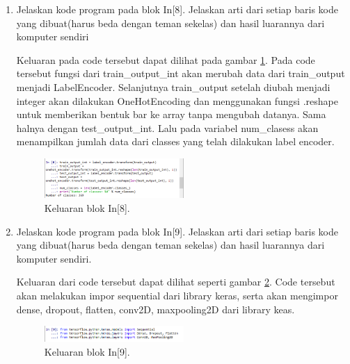 \begin{enumerate}
\item Jelaskan kode program pada blok In[8]. Jelaskan arti dari setiap baris kode yang dibuat(harus beda dengan teman sekelas) dan hasil luarannya dari komputer sendiri \par

Keluaran pada code tersebut dapat dilihat pada gambar \ref{math8}. Pada code tersebut fungsi dari train\_output\_int akan merubah data dari train\_output menjadi LabelEncoder. Selanjutnya train\_output setelah diubah menjadi integer akan dilakukan OneHotEncoding dan menggunakan fungsi .reshape untuk memberikan bentuk bar ke array tanpa mengubah datanya. Sama halnya dengan test\_output\_int. Lalu pada variabel num\_clasess akan menampilkan jumlah data dari classes yang telah dilakukan label encoder.
		\begin{figure}[!htbp]
		\centerline{\includegraphics[width=0.5\textwidth]{figures/im/math8.png}}
		\caption{Keluaran blok In[8].}
		\label{math8}
		\end{figure}

\item Jelaskan kode program pada blok In[9]. Jelaskan arti dari setiap baris kode yang dibuat(harus beda dengan teman sekelas) dan hasil luarannya dari komputer sendiri.\par

Keluaran dari code tersebut dapat dilihat seperti gambar \ref{math9}. Code tersebut akan melakukan impor sequential dari library keras, serta akan mengimpor dense, dropout, flatten, conv2D, maxpooling2D dari library keas.
		\begin{figure}[!htbp]
		\centerline{\includegraphics[width=0.5\textwidth]{figures/im/math9.png}}
		\caption{Keluaran blok In[9].}
		\label{math9}
		\end{figure}


\end{enumerate}
